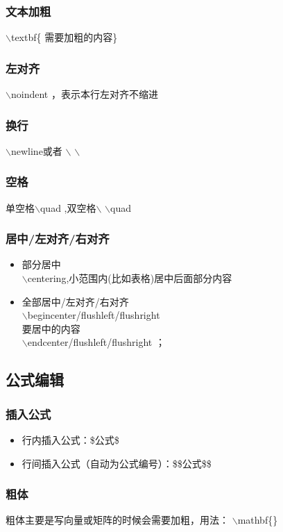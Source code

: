 \documentclass{article}
\begin{document}
\subsubsection{文本加粗}
$\backslash$textbf\{ 需要加粗的内容\}

\subsubsection{左对齐}
$\backslash$noindent ，表示本行左对齐不缩进

\subsubsection{换行}
$\backslash$newline或者 $\backslash$ $\backslash$

\subsubsection{空格}
单空格$\backslash$quad ,双空格$\backslash$ $\backslash$quad

\subsubsection{居中/左对齐/右对齐}
\begin{itemize}
    \item 部分居中\\
    $\backslash$centering,小范围内(比如表格)居中后面部分内容
    \item 全部居中/左对齐/右对齐\\
    $\backslash$begin{center/flushleft/flushright}\\要居中的内容\\
    $\backslash$end{center/flushleft/flushright }；
\end{itemize}

\subsection{公式编辑}
\subsubsection{插入公式}
\begin{itemize}
    \item 行内插入公式：\$公式\$
    \item 行间插入公式（自动为公式编号）：\$\$公式\$\$
\end{itemize}
\subsubsection{粗体}
粗体主要是写向量或矩阵的时候会需要加粗，用法：
$\backslash$mathbf\{\}
\end{document}
